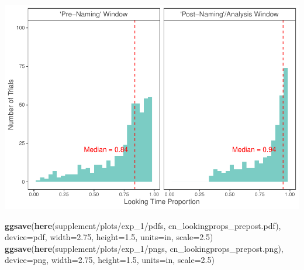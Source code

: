 \documentclass[
  doc,floatsintext]{apa6}
\newenvironment{Shaded}{\begin{snugshade}}{\end{snugshade}}
\newcommand{\AttributeTok}[1]{\textcolor[rgb]{0.13,0.29,0.53}{#1}}
\newcommand{\FloatTok}[1]{\textcolor[rgb]{0.00,0.00,0.81}{#1}}
\newcommand{\FunctionTok}[1]{\textcolor[rgb]{0.13,0.29,0.53}{\textbf{#1}}}
\newcommand{\NormalTok}[1]{#1}
\newcommand{\StringTok}[1]{\textcolor[rgb]{0.31,0.60,0.02}{#1}}
\begin{document}
\includegraphics{revised_ms_analyses_files/figure-latex/r2-cn-durs-prepost-lookingprops-1.pdf}

\begin{Shaded}
\begin{Highlighting}[]
\FunctionTok{ggsave}\NormalTok{(}\FunctionTok{here}\NormalTok{(}\StringTok{\textquotesingle{}supplement/plots/exp\_1/pdfs\textquotesingle{}}\NormalTok{, }\StringTok{\textquotesingle{}cn\_lookingprops\_prepost.pdf\textquotesingle{}}\NormalTok{), }
       \AttributeTok{device=}\StringTok{\textquotesingle{}pdf\textquotesingle{}}\NormalTok{, }\AttributeTok{width=}\FloatTok{2.75}\NormalTok{, }\AttributeTok{height=}\FloatTok{1.5}\NormalTok{, }\AttributeTok{units=}\StringTok{\textquotesingle{}in\textquotesingle{}}\NormalTok{, }\AttributeTok{scale=}\FloatTok{2.5}\NormalTok{)}
\FunctionTok{ggsave}\NormalTok{(}\FunctionTok{here}\NormalTok{(}\StringTok{\textquotesingle{}supplement/plots/exp\_1/pngs\textquotesingle{}}\NormalTok{, }\StringTok{\textquotesingle{}cn\_lookingprops\_prepost.png\textquotesingle{}}\NormalTok{), }
       \AttributeTok{device=}\StringTok{\textquotesingle{}png\textquotesingle{}}\NormalTok{, }\AttributeTok{width=}\FloatTok{2.75}\NormalTok{, }\AttributeTok{height=}\FloatTok{1.5}\NormalTok{, }\AttributeTok{units=}\StringTok{\textquotesingle{}in\textquotesingle{}}\NormalTok{, }\AttributeTok{scale=}\FloatTok{2.5}\NormalTok{)}
\end{Highlighting}
\end{Shaded}
\end{document}

